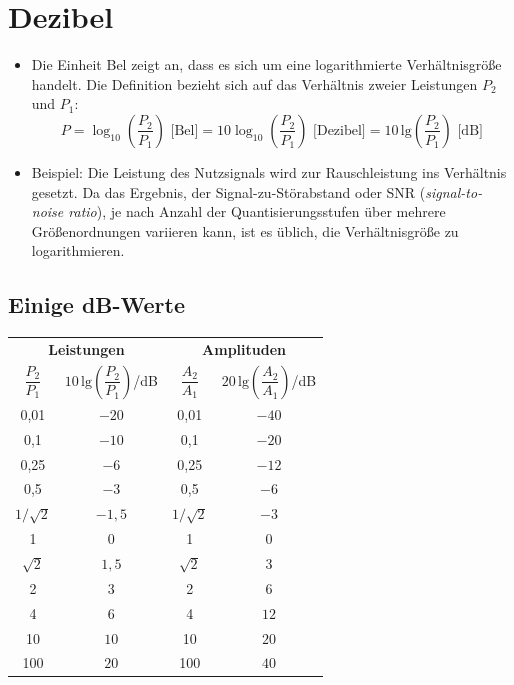 \section{Dezibel}
\label{sec:dezibel}

\begin{itemize}
  \item Die Einheit Bel zeigt an, dass es sich um eine logarithmierte Verhältnisgröße handelt. Die Definition bezieht sich auf das Verhältnis zweier Leistungen $P_2$ und $P_1$:
  $$
  P = \log_{10}\!\left(\frac{P_2}{P_1}\right) \text{ [Bel]}
    = 10\log_{10}\!\left(\frac{P_2}{P_1}\right) \text{ [Dezibel]}
    = 10\,\mathrm{lg}\!\left(\frac{P_2}{P_1}\right) \text{ [dB]}
  $$
  \item Beispiel: Die Leistung des Nutzsignals wird zur Rauschleistung ins Verhältnis gesetzt. Da das Ergebnis, der Signal-zu-Störabstand oder SNR (\textit{signal-to-noise ratio}), je nach Anzahl der Quantisierungsstufen über mehrere Größenordnungen variieren kann, ist es üblich, die Verhältnisgröße zu logarithmieren.
\end{itemize}

\subsection*{Einige dB-Werte}

\begin{center}
\begin{tabular}{cc|cc}
\toprule
\multicolumn{2}{c|}{\textbf{Leistungen}} & \multicolumn{2}{c}{\textbf{Amplituden}} \\
$\dfrac{P_2}{P_1}$ & $10\,\mathrm{lg}\!\left(\dfrac{P_2}{P_1}\right)$/dB
& $\dfrac{A_2}{A_1}$ & $20\,\mathrm{lg}\!\left(\dfrac{A_2}{A_1}\right)$/dB \\
\midrule
0{,}01      & $-20$ & 0{,}01      & $-40$ \\
0{,}1       & $-10$ & 0{,}1       & $-20$ \\
0{,}25      & $-6$  & 0{,}25      & $-12$ \\
0{,}5       & $-3$  & 0{,}5       & $-6$  \\
$1/\sqrt{2}$& $-1{,}5$ & $1/\sqrt{2}$ & $-3$ \\
1           & $0$   & 1           & $0$   \\
$\sqrt{2}$  & $1{,}5$  & $\sqrt{2}$   & $3$  \\
2           & $3$   & 2           & $6$   \\
4           & $6$   & 4           & $12$  \\
10          & $10$  & 10          & $20$  \\
100         & $20$  & 100         & $40$  \\
\bottomrule
\end{tabular}
\end{center}

